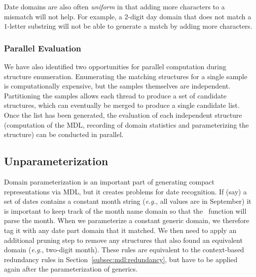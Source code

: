 Date domains are also often \emph{uniform} in that adding more characters to a mismatch will not help. For example, a $2$-digit day domain that does not match a $1$-letter substring will not be able to generate a match by adding more characters.

\subsubsection{Parallel Evaluation}
We have also identified two opportunities for parallel computation during structure enumeration.
Enumerating the matching structures for a single sample is computationally expensive, but the samples themselves are independent. 
Partitioning the samples allows each thread to produce a set of candidate structures, which can eventually be merged to produce a single candidate list.
Once the list has been generated, the evaluation of each independent structure (computation of the MDL, recording of domain statistics and parameterizing the structure) can be conducted in parallel.

\subsection{Unparameterization}
Domain parameterization is an important part of generating compact representations via MDL, but it creates problems for date recognition. 
If (say) a set of dates contains a constant month string (\textit{e.g.}, all values are in September) it is important to keep track of the month name domain
so that the \dateparse\ function will parse the month.
When we parameterize a constant generic  domain, we therefore tag it with any date part domain that it matched. 
We then need to apply an additional pruning step to remove any structures that also found an equivalent domain (\textit{e.g.}, two-digit month). 
These rules are equivalent to the context-based redundancy rules in Section~\ref{subsec:mdl:redundancy}, but have to be applied again after the parameterization of generics.

